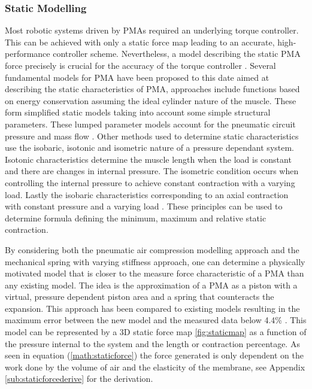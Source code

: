 \documentclass[11pt,a4paper]{article}
\begin{document}
\subsubsection{Static Modelling}
\label{sub:static_modelling}
Most robotic systems driven by PMAs required an underlying torque controller. This can be achieved with only a static force map leading to an accurate, high-performance controller scheme. Nevertheless, a model describing the static PMA force precisely is crucial for the accuracy of the torque controller \cite{martens_boblan_2017}. Several fundamental models for PMA have been proposed to this date aimed at describing the static characteristics of PMA, approaches include functions based on energy conservation assuming the ideal cylinder nature of the muscle. These form simplified static models taking into account some simple structural parameters. These lumped parameter models account for the pneumatic circuit pressure and mass flow \cite{chou_hannaford_1996}. Other methods used to determine static characteristics use the isobaric, isotonic and isometric nature of a pressure dependant system. Isotonic characteristics determine the muscle length when the load is constant and there are changes in internal pressure. The isometric condition occurs when controlling the internal pressure to achieve constant contraction with a varying load. Lastly the isobaric characteristics corresponding to an axial contraction with constant pressure and a varying load \cite{takosoglu_laski_blasiak_bracha_pietrala_2016}. These principles can be used to determine formula defining the minimum, maximum and relative static contraction. \newline

By considering both the pneumatic air compression modelling approach and the mechanical spring with varying stiffness approach, one can determine a physically motivated model that is closer to the measure force characteristic of a PMA than any existing model. The idea is the approximation of a PMA as a piston with a virtual, pressure dependent piston area and a spring that counteracts the expansion. This approach has been compared to existing models resulting in the maximum error between the new model and the measured data below 4.4\% \cite{martens_boblan_2017}. This model can be represented by a 3D static force map \ref{fig:staticmap} as a function of the pressure internal to the system and the length or contraction percentage. As seen in equation (\ref{math:staticforce}) the force generated is only dependent on the work done by the volume of air and the elasticity of the membrane, see Appendix \ref{sub:staticforcederive} for the derivation.
\end{document}
